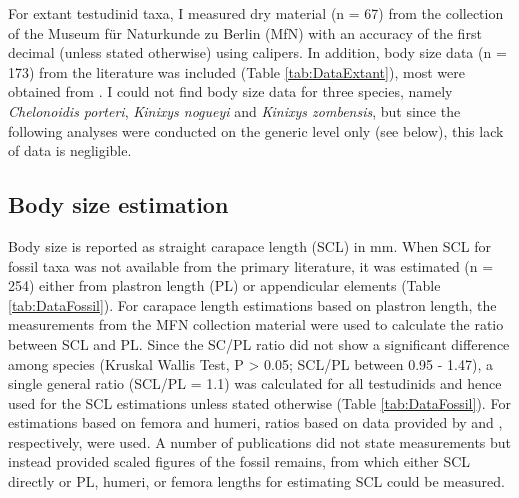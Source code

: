 For extant testudinid taxa, I measured dry material (n = 67) from the collection of the Museum für Naturkunde zu Berlin (MfN) with an accuracy of the first decimal (unless stated otherwise) using calipers. In addition, body size data (n = 173) from the literature was included (Table \ref{tab:DataExtant}), most were obtained from \cite{Itescu2014}. I could not find body size data for three species, namely \textit{Chelonoidis porteri}, \textit{Kinixys nogueyi} and \textit{Kinixys zombensis}, but since the following analyses were conducted on the generic level only (see below), this lack of data is negligible.

\subsection{Body size estimation}
Body size is reported as straight carapace length (SCL) in mm. When SCL for fossil taxa was not available from the primary literature, it was estimated (n = 254) either from plastron length (PL) or appendicular elements (Table \ref{tab:DataFossil}). For carapace length estimations based on plastron length, the measurements from the MFN collection material were used to calculate the ratio between SCL and PL. Since the SC/PL ratio did not show a significant difference among species (Kruskal Wallis Test, P > 0.05; SCL/PL between 0.95 - 1.47), a single general ratio (SCL/PL = 1.1) was calculated for all testudinids and hence used for the SCL estimations unless stated otherwise (Table \ref{tab:DataFossil}). For estimations based on femora and humeri, ratios based on data provided by \cite{Hutterer1998} and \cite{Franz2001a}, respectively, were used. A number of publications did not state measurements but instead provided scaled figures of the fossil remains, from which either SCL directly or PL, humeri, or femora lengths for estimating SCL could be measured.




